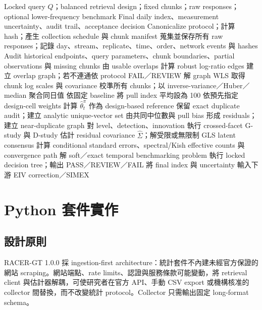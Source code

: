 \documentclass[12pt,a4paper,oneside]{article}
\begin{document}
\begin{algorithm}[H]
\caption{RACER-GT 長期日頻指標建構}
\label{alg:racergt}
\begin{algorithmic}[1]
\Require Locked query $Q$；balanced retrieval design；fixed chunks；raw responses；optional lower-frequency benchmark
\Ensure Final daily index、measurement uncertainty、audit trail、acceptance decision
\State Canonicalize protocol；計算 hash；產生 collection schedule 與 chunk manifest
\State 蒐集並保存所有 raw responses；記錄 day、stream、replicate、time、order、network events 與 hashes
\State Audit historical endpoints、query parameters、chunk boundaries、partial observations 與 missing chunks
  \State 由 usable overlaps 計算 robust log-ratio edges
  \State 建立 overlap graph；若不連通依 protocol FAIL／REVIEW
  \State 解 graph WLS 取得 chunk log scales 與 covariance
  \State 校準所有 chunks；以 inverse-variance／Huber／median 聚合同日值
  \State 依固定 baseline 將 pull index 平均設為 100
\EndFor
\State 依預先指定 design-cell weights 計算 $\widehat\theta_t^{\pi}$ 作為 design-based reference
\State 保留 exact duplicate audit；建立 analytic unique-vector set
\State 由共同中位數與 pull bias 形成 residuals；建立 near-duplicate graph
\State 對 level、detection、innovation 執行 crossed-facet G-study 與 D-study
\State 估計 residual covariance $\widehat\Sigma$；解受限或無限制 GLS latent consensus
\State 計算 conditional standard errors、spectral/Kish effective counts 與 convergence path
  \State 解 soft／exact temporal benchmarking problem
\EndIf
\State 執行 locked decision tree；輸出 PASS／REVIEW／FAIL
\State 將 final index 與 uncertainty 輸入下游 EIV correction／SIMEX
\end{algorithmic}
\end{algorithm}

\section{Python 套件實作}

\subsection{設計原則}

RACER-GT 1.0.0 採 ingestion-first architecture：統計套件不內建未經官方保證的網站 scraping。網站端點、rate limits、認證與服務條款可能變動，將 retrieval client 與估計器解耦，可使研究者在官方 API、手動 CSV export 或機構核准的 collector 間替換，而不改變統計 protocol。Collector 只需輸出固定 long-format schema。
\end{document}
